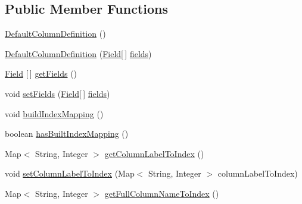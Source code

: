 \subsection*{Public Member Functions}
\begin{DoxyCompactItemize}
\item 
\mbox{\hyperlink{classcom_1_1mysql_1_1cj_1_1result_1_1_default_column_definition_ad3b4823ad9c50b02bcd420496a754260}{Default\+Column\+Definition}} ()
\item 
\mbox{\hyperlink{classcom_1_1mysql_1_1cj_1_1result_1_1_default_column_definition_a9cc411410985491d530f3310c15b0460}{Default\+Column\+Definition}} (\mbox{\hyperlink{classcom_1_1mysql_1_1cj_1_1result_1_1_field}{Field}}\mbox{[}$\,$\mbox{]} \mbox{\hyperlink{classcom_1_1mysql_1_1cj_1_1result_1_1_default_column_definition_a3f4d762bd95f857062625fddb3a02102}{fields}})
\item 
\mbox{\hyperlink{classcom_1_1mysql_1_1cj_1_1result_1_1_field}{Field}} \mbox{[}$\,$\mbox{]} \mbox{\hyperlink{classcom_1_1mysql_1_1cj_1_1result_1_1_default_column_definition_aef87110125ef18eea7f51f4c2d22b03a}{get\+Fields}} ()
\item 
void \mbox{\hyperlink{classcom_1_1mysql_1_1cj_1_1result_1_1_default_column_definition_af37a2815b566bd95c2109c7649adf6f7}{set\+Fields}} (\mbox{\hyperlink{classcom_1_1mysql_1_1cj_1_1result_1_1_field}{Field}}\mbox{[}$\,$\mbox{]} \mbox{\hyperlink{classcom_1_1mysql_1_1cj_1_1result_1_1_default_column_definition_a3f4d762bd95f857062625fddb3a02102}{fields}})
\item 
void \mbox{\hyperlink{classcom_1_1mysql_1_1cj_1_1result_1_1_default_column_definition_a765750a709687a3a53d1fe1fa9891c96}{build\+Index\+Mapping}} ()
\item 
boolean \mbox{\hyperlink{classcom_1_1mysql_1_1cj_1_1result_1_1_default_column_definition_a0eefd044779756c0945361b5a0627a7b}{has\+Built\+Index\+Mapping}} ()
\item 
Map$<$ String, Integer $>$ \mbox{\hyperlink{classcom_1_1mysql_1_1cj_1_1result_1_1_default_column_definition_a625450cf994980769ce878b7e8ede9b3}{get\+Column\+Label\+To\+Index}} ()
\item 
void \mbox{\hyperlink{classcom_1_1mysql_1_1cj_1_1result_1_1_default_column_definition_acf4c5671472b2d95e2ca7e8600a58999}{set\+Column\+Label\+To\+Index}} (Map$<$ String, Integer $>$ column\+Label\+To\+Index)
\item 
Map$<$ String, Integer $>$ \mbox{\hyperlink{classcom_1_1mysql_1_1cj_1_1result_1_1_default_column_definition_a49d89dc5bfb3818140db790571278aa1}{get\+Full\+Column\+Name\+To\+Index}} ()

\end{DoxyCompactItemize}
